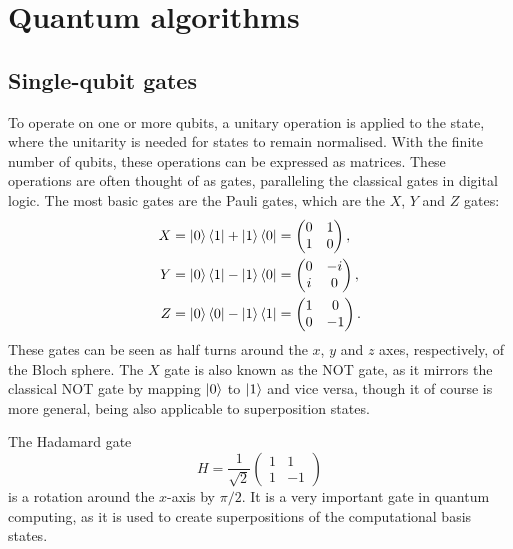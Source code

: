 \section{Quantum algorithms}
\subsection{Single-qubit gates}
To operate on one or more qubits, a unitary operation is applied to the state, where the unitarity is needed for states to remain normalised.
With the finite number of qubits, these operations can be expressed as matrices.
These operations are often thought of as gates, paralleling the classical gates in digital logic.
The most basic gates are the Pauli gates, which are the $X$, $Y$ and $Z$ gates:
\begin{align}
    X =\ket{0}\bra{1} + \ket{1}\bra{0} & = \begin{pmatrix} 0 & 1 \\ 1 & 0 \end{pmatrix},  \\
    Y =\ket{0}\bra{1} - \ket{1}\bra{0} & = \begin{pmatrix} 0 & -i \\ i & 0 \end{pmatrix}, \\
    Z =\ket{0}\bra{0} - \ket{1}\bra{1} & = \begin{pmatrix} 1 & 0 \\ 0 & -1 \end{pmatrix}.
\end{align}
These gates can be seen as half turns around the $x$, $y$ and $z$ axes, respectively, of the Bloch sphere.
The $X$ gate is also known as the NOT gate, as it mirrors the classical NOT gate by mapping $\ket{0}$ to $\ket{1}$ and vice versa, though it of course is more general, being also applicable to superposition states.

The Hadamard gate
\begin{equation}
    H = \frac{1}{\sqrt{2}} \begin{pmatrix} 1 & 1 \\ 1 & -1 \end{pmatrix}
\end{equation}
is a rotation around the $x$-axis by $\pi/2$.
It is a very important gate in quantum computing, as it is used to create superpositions of the computational basis states.


